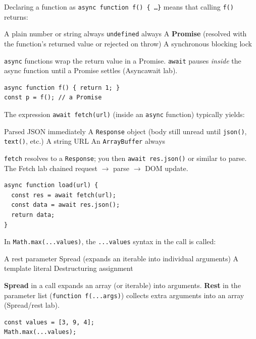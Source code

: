 \newpage

\question[4]
Declaring a function as \texttt{async function f() \{ \ldots \}} means that calling \texttt{f()} returns:
\begin{choices}
  \choice A plain number or string always
  \choice \texttt{undefined} always
  \CorrectChoice A \textbf{Promise} (resolved with the function's returned value or rejected on throw)
  \choice A synchronous blocking lock
\end{choices}
\begin{solution}
  \texttt{async} functions wrap the return value in a Promise. \texttt{await} pauses \emph{inside} the async function until a Promise settles (Asyncawait lab).
\begin{lstlisting}[style=js]
async function f() { return 1; }
const p = f(); // a Promise
\end{lstlisting}
\end{solution}

\question[4]
The expression \texttt{await fetch(url)} (inside an \texttt{async} function) typically yields:
\begin{choices}
  \choice Parsed JSON immediately
  \CorrectChoice A \texttt{Response} object (body still unread until \texttt{json()}, \texttt{text()}, etc.)
  \choice A string URL
  \choice An \texttt{ArrayBuffer} always
\end{choices}
\begin{solution}
  \texttt{fetch} resolves to a \texttt{Response}; you then \texttt{await res.json()} or similar to parse. The Fetch lab chained request $\rightarrow$ parse $\rightarrow$ DOM update.
\begin{lstlisting}[style=js]
async function load(url) {
  const res = await fetch(url);
  const data = await res.json();
  return data;
}
\end{lstlisting}
\end{solution}

\question[4]
In \texttt{Math.max(...values)}, the \texttt{...values} syntax in the call is called:
\begin{choices}
  \choice A rest parameter
  \CorrectChoice Spread (expands an iterable into individual arguments)
  \choice A template literal
  \choice Destructuring assignment
\end{choices}
\begin{solution}
  \textbf{Spread} in a call expands an array (or iterable) into arguments. \textbf{Rest} in the parameter list (\texttt{function f(...args)}) collects extra arguments into an array (Spread/rest lab).
\begin{lstlisting}[style=js]
const values = [3, 9, 4];
Math.max(...values);
\end{lstlisting}
\end{solution}


